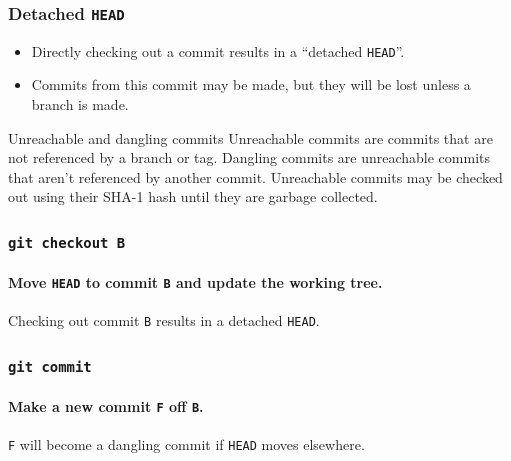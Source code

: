 \documentclass{beamer}
\newcommand\gitcmd[1]{\texttt{git #1}}
\newcommand\grefspec[1]{\texttt{#1}}
\newcommand\gHEAD{\texttt{HEAD}}
\begin{document}
\begin{frame}
  \frametitle{Detached \gHEAD{}}

  \begin{itemize}
    \item Directly checking out a commit results in a ``detached \gHEAD{}''.
    \item Commits from this commit may be made, but they will be lost unless a branch is made.
  \end{itemize}
  \vfill
  \begin{block}{Unreachable and dangling commits}
    Unreachable commits are commits that are not referenced by a branch or tag. Dangling commits are unreachable commits that aren't referenced by another commit. Unreachable commits may be checked out using their SHA-1 hash until they are garbage collected.
  \end{block}
\end{frame}

\begin{frame}
  \frametitle{\gitcmd{checkout B}}
  \framesubtitle{Move \gHEAD{} to commit \grefspec{B} and update the working tree.}
  \begin{figure}
    \centering
  \end{figure}

  Checking out commit \grefspec{B} results in a detached \gHEAD{}.
\end{frame}

\begin{frame}
  \frametitle{\gitcmd{commit}}
  \framesubtitle{Make a new commit \grefspec{F} off \grefspec{B}.}
  \begin{figure}
    \centering
  \end{figure}

  \grefspec{F} will become a dangling commit if \grefspec{HEAD} moves elsewhere.
\end{frame}
\end{document}
